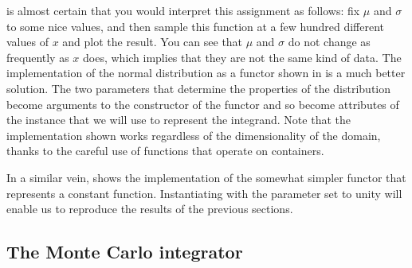 is almost certain that you would interpret this assignment as follows: fix $\mu$ and $\sigma$
to some nice values, and then sample this function at a few hundred different values of $x$ and
plot the result. You can see that $\mu$ and $\sigma$ do not change as frequently as $x$ does,
which implies that they are not the same kind of data. The implementation of the normal
distribution as a functor shown in  is a much better solution.
%
%
The two parameters that determine the properties of the distribution become arguments to the
constructor of the functor and so become attributes of the instance that we will use to
represent the integrand. Note that the implementation shown works regardless of the
dimensionality of the domain, thanks to the careful use of functions that operate on
containers. 

In a similar vein,  shows the implementation of the somewhat
simpler functor  that represents a constant function. Instantiating
 with the parameter  set to unity will enable us to
reproduce the results of the previous sections.
%
%

\subsection{The Monte Carlo integrator}
\label{sec:classes:driver:final}

